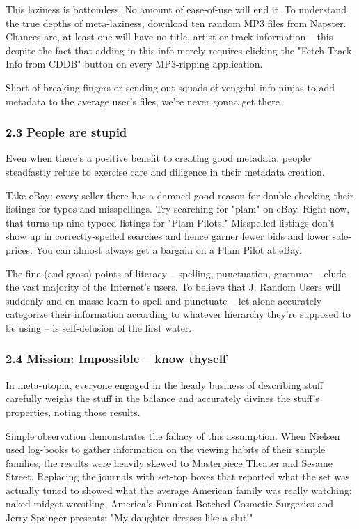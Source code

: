 This laziness is bottomless. No amount of ease-of-use will end it.
To understand the true depths of meta-laziness, download ten random
MP3 files from Napster. Chances are, at least one will have no
title, artist or track information -- this despite the fact that
adding in this info merely requires clicking the "Fetch Track Info
from CDDB" button on every MP3-ripping application.

Short of breaking fingers or sending out squads of vengeful
info-ninjas to add metadata to the average user's files, we're
never gonna get there.

\subsubsection{2.3 People are stupid}

Even when there's a positive benefit to creating good metadata,
people steadfastly refuse to exercise care and diligence in their
metadata creation.

Take eBay: every seller there has a damned good reason for
double-checking their listings for typos and misspellings. Try
searching for "plam" on eBay. Right now, that turns up nine typoed
listings for "Plam Pilots." Misspelled listings don't show up in
correctly-spelled searches and hence garner fewer bids and lower
sale-prices. You can almost always get a bargain on a Plam Pilot at
eBay.

The fine (and gross) points of literacy -- spelling, punctuation,
grammar -- elude the vast majority of the Internet's users. To
believe that J. Random Users will suddenly and en masse learn to
spell and punctuate -- let alone accurately categorize their
information according to whatever hierarchy they're supposed to be
using -- is self-delusion of the first water.

\subsubsection{2.4 Mission: Impossible -- know thyself}

In meta-utopia, everyone engaged in the heady business of
describing stuff carefully weighs the stuff in the balance and
accurately divines the stuff's properties, noting those results.

Simple observation demonstrates the fallacy of this assumption.
When Nielsen used log-books to gather information on the viewing
habits of their sample families, the results were heavily skewed to
Masterpiece Theater and Sesame Street. Replacing the journals with
set-top boxes that reported what the set was actually tuned to
showed what the average American family was really watching: naked
midget wrestling, America's Funniest Botched Cosmetic Surgeries and
Jerry Springer presents: "My daughter dresses like a slut!"


